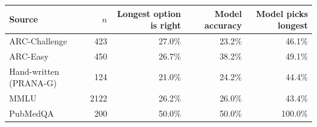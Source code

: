 \begin{tabular}{lrrrr}
\toprule
Source & $n$ & Longest option is right & Model accuracy & Model picks longest \\
\midrule
ARC-Challenge & 423 & 27.0\% & 23.2\% & 46.1\% \\
ARC-Easy & 450 & 26.7\% & 38.2\% & 49.1\% \\
Hand-written (PRANA-G) & 124 & 21.0\% & 24.2\% & 44.4\% \\
MMLU & 2122 & 26.2\% & 26.0\% & 43.4\% \\
PubMedQA & 200 & 50.0\% & 50.0\% & 100.0\% \\
\bottomrule
\end{tabular}
